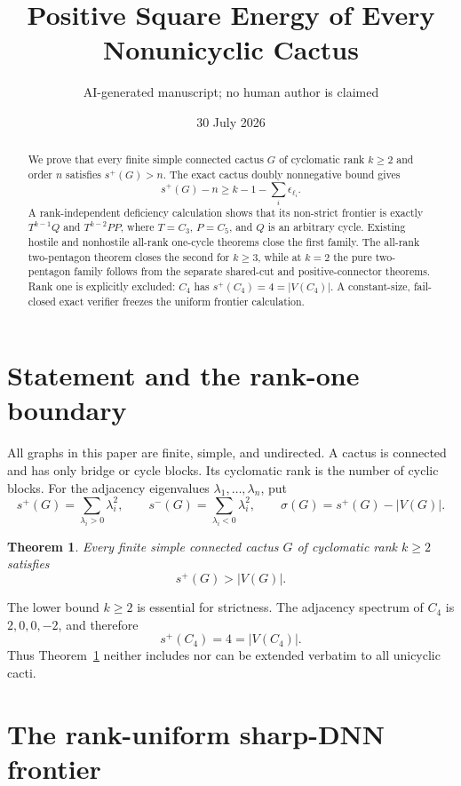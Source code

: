 \documentclass[11pt]{article}
\title{Positive Square Energy of Every Nonunicyclic Cactus}
\author{AI-generated manuscript; no human author is claimed}
\date{30 July 2026}
\newtheorem{theorem}{Theorem}[section]
\newcommand{\splus}{s^+}
\newcommand{\sminus}{s^-}
\newcommand{\sig}{\sigma}
\begin{document}
\maketitle

\begin{abstract}
We prove that every finite simple connected cactus $G$ of cyclomatic rank
$k\geq2$ and order $n$ satisfies $s^+(G)>n$.  The exact cactus doubly
nonnegative bound gives
\[
 s^+(G)-n\geq k-1-\sum_i\epsilon_{\ell_i}.
\]
A rank-independent deficiency calculation shows that its non-strict frontier
is exactly $T^{k-1}Q$ and $T^{k-2}PP$, where $T=C_3$, $P=C_5$, and $Q$ is an
arbitrary cycle.  Existing hostile and nonhostile all-rank one-cycle theorems
close the first family.  The all-rank two-pentagon theorem closes the second
for $k\geq3$, while at $k=2$ the pure two-pentagon family follows from the
separate shared-cut and positive-connector theorems.  Rank one is explicitly
excluded: $C_4$ has $s^+(C_4)=4=|V(C_4)|$.  A constant-size, fail-closed exact
verifier freezes the uniform frontier calculation.
\end{abstract}

\section{Statement and the rank-one boundary}

All graphs in this paper are finite, simple, and undirected.  A cactus is
connected and has only bridge or cycle blocks.  Its cyclomatic rank is the
number of cyclic blocks.  For the adjacency eigenvalues
$\lambda_1,\ldots,\lambda_n$, put
\[
 \splus(G)=\sum_{\lambda_i>0}\lambda_i^2,
 \qquad
 \sminus(G)=\sum_{\lambda_i<0}\lambda_i^2,
 \qquad
 \sig(G)=\splus(G)-|V(G)|.
\]

\begin{theorem}\label{thm:main}
Every finite simple connected cactus $G$ of cyclomatic rank $k\geq2$ satisfies
\[
 \boxed{\splus(G)>|V(G)|}.
\]
\end{theorem}

The lower bound $k\geq2$ is essential for strictness.  The adjacency spectrum
of $C_4$ is $2,0,0,-2$, and therefore
\[
 \splus(C_4)=4=|V(C_4)|.
\]
Thus Theorem~\ref{thm:main} neither includes nor can be extended verbatim to
all unicyclic cacti.

\section{The rank-uniform sharp-DNN frontier}
\end{document}
